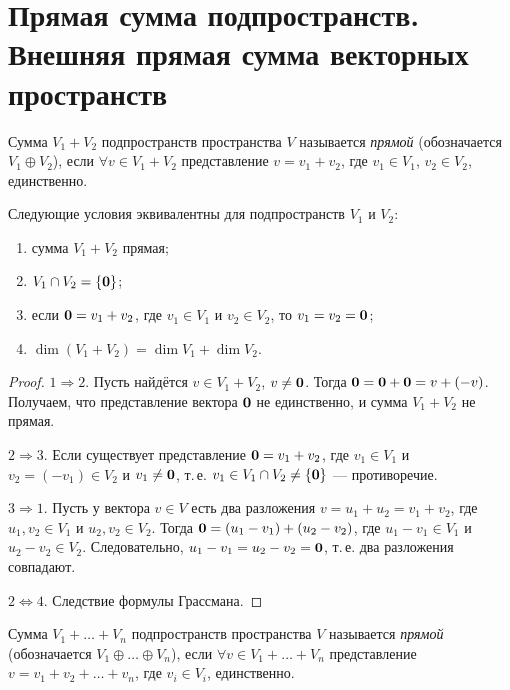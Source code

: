 \section{Прямая сумма подпространств. Внешняя прямая сумма векторных пространств}

\begin{definition}
    Сумма $V_1 + V_2$ подпространств пространства $V$ называется \textit{прямой} (обозначается $V_1 \oplus V_2$), если $\forall v \in V_1 + V_2$ представление $v = v_1 + v_2$, где $v_1 \in V_1$, $v_2 \in V_2$, единственно.
\end{definition}

\begin{theorem}
    Следующие условия эквивалентны для подпространств $V_1$ и $V_2$:
    \begin{enumerate}[nolistsep]
        \item сумма $V_1 + V_2$ прямая;
        \item $V_1 \cap V_2 = \{\boldsymbol{0}\}$;
        \item если $\boldsymbol{0} = v_1 + v_2$, где $v_1 \in V_1$ и $v_2 \in V_2$, то $v_1 = v_2 = \boldsymbol{0}$;
        \item $\dim(V_1 + V_2) = \dim V_1 + \dim V_2$.
    \end{enumerate}
\end{theorem}

\begin{proof}
    $1 \Rightarrow 2$. Пусть найдётся $v \in V_1 + V_2$, $v \ne \boldsymbol{0}$. Тогда $\boldsymbol{0} = \boldsymbol{0} + \boldsymbol{0} = v + (-v)$. Получаем, что представление вектора $\boldsymbol{0}$ не единственно, и сумма $V_1 + V_2$ не прямая.

    $2 \Rightarrow 3$. Если существует представление $\boldsymbol{0} = v_1 + v_2$, где $v_1 \in V_1$ и $v_2 = (-v_1) \in V_2$ и $v_1 \ne \boldsymbol{0}$, т.\,е. $v_1 \in V_1 \cap V_2 \ne \{\boldsymbol{0}\}$ --- противоречие.

    $3 \Rightarrow 1$. Пусть у вектора $v \in V$ есть два разложения $v = u_1 + u_2 = v_1 + v_2$, где $u_1, v_2 \in V_1$ и $u_2, v_2 \in V_2$. Тогда $\boldsymbol{0} = (u_1 - v_1) + (u_2 - v_2)$, где $u_1 - v_1 \in V_1$ и $u_2 - v_2 \in V_2$. Следовательно, $u_1 - v_1 = u_2 - v_2 = \boldsymbol{0}$, т.\,е. два разложения совпадают.

    $2 \Leftrightarrow 4$. Следствие формулы Грассмана.
\end{proof}

\begin{definition}
    Сумма $V_1 + \ldots + V_n$ подпространств пространства $V$ называется \textit{прямой} (обозначается $V_1 \oplus \ldots \oplus V_n$), если $\forall v \in V_1 + \ldots + V_n$ представление $v = v_1 + v_2 + \ldots + v_n$, где $v_i \in V_i$, единственно.
\end{definition}

